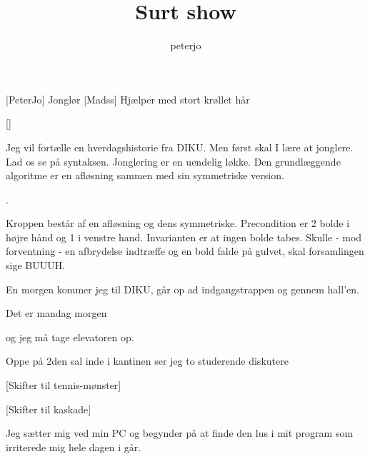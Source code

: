 \documentclass[a4paper,11pt]{article}
\title{Surt show}
\author{peterjo}
\begin{document}
\maketitle

\begin{roles}
[PeterJo] Jonglør
[Madss] Hjælper med stort krøllet hår
\end{roles}

\begin{props}
[]
\end{props}

  
\begin{sketch}


 Jeg vil fortælle en hverdagshistorie fra DIKU. Men først skal
I lære at jonglere. Lad os se på syntaksen. Jonglering er en uendelig
løkke.  Den grundlæggende algoritme er en afløsning sammen med sin
symmetriske version.

. 

Kroppen består af en afløsning og dens symmetriske. Precondition er 2
bolde i højre hånd og 1 i venstre hand. Invarianten er at ingen bolde
tabes. Skulle - mod forventning - en afbrydelse indtræffe og en bold
falde på gulvet, skal forsamlingen sige BUUUH.




En morgen kommer jeg til DIKU, går op ad indgangstrappen og gennem
hall'en. 


Det er mandag morgen


og jeg må tage elevatoren op.


Oppe på 2den sal inde i kantinen ser jeg to studerende diskutere

 [Skifter til tennis-mønster]

 [Skifter til kaskade]

Jeg sætter mig ved min PC og begynder på at finde den lus i mit
program som irriterede mig hele dagen i går.



\end{sketch}
\end{document}
